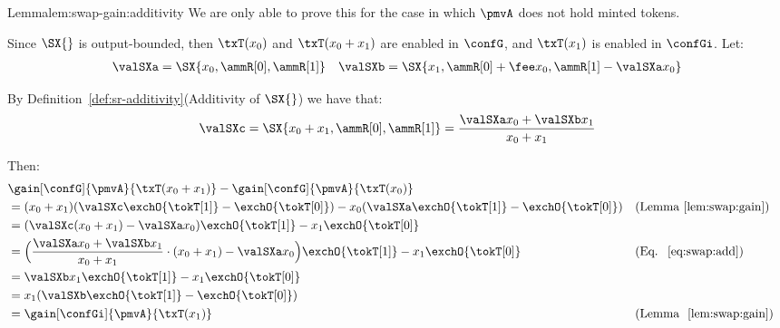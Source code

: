 \begin{proofof}{Lemma}{lem:swap-gain:additivity}
    We are only able to prove this for the case in which $\pmvA$ does not hold minted tokens. 

    Since $\SX{}$ is output-bounded, then $\txT(x_0)$ and $\txT(x_0 + x_1)$ are enabled in $\confG$, and $\txT(x_1)$ is enabled in $\confGi$. Let: 
    \begin{align*}
        \valSXa = \SX{x_0, \ammR[0], \ammR[1]} 
        \quad 
        \valSXb = \SX{x_1, \ammR[0] + \fee x_0, \ammR[1] - \valSXa x_0}
    \end{align*}

    By Definition~\ref{def:sr-additivity}(Additivity of $\SX{}$) we have that: 
    \begin{equation}
    \label{eq:swap:add}
        \valSXc = \SX{x_0 + x_1, \ammR[0], \ammR[1]} 
                = \frac{\valSXa x_0 + \valSXb x_1}{x_0 + x_1}
    \end{equation}

    Then: 
    \begin{align*}
        & \gain[\confG]{\pmvA}{\txT(x_0+x_1)} - \gain[\confG]{\pmvA}{\txT(x_0)}
        \\
        & = (x_0 + x_1)(\valSXc \exchO{\tokT[1]} - \exchO{\tokT[0]}) - 
            x_0(\valSXa \exchO{\tokT[1]} - \exchO{\tokT[0]}) 
        && \text{(Lemma~\ref{lem:swap:gain})}
        \\
        & = (\valSXc(x_0 + x_1) - \valSXa x_0)\exchO{\tokT[1]} - x_1 \exchO{\tokT[0]}
        \\
        & = \Big ( \frac{\valSXa x_0 + \valSXb x_1}{x_0 + x_1} \cdot (x_0 + x_1) - \valSXa x_0 \Big )\exchO{\tokT[1]} - x_1 \exchO{\tokT[0]}
        && \text{(Eq. ~\ref{eq:swap:add})}
        \\
        & = \valSXb x_1 \exchO{\tokT[1]} - x_1 \exchO{\tokT[0]}
        \\
        & = x_1 (\valSXb \exchO{\tokT[1]} - \exchO{\tokT[0]})
        \\
        & = \gain[\confGi]{\pmvA}{\txT(x_1)}
        && \text{(Lemma ~\ref{lem:swap:gain})}
    \end{align*}
    
\end{proofof}


